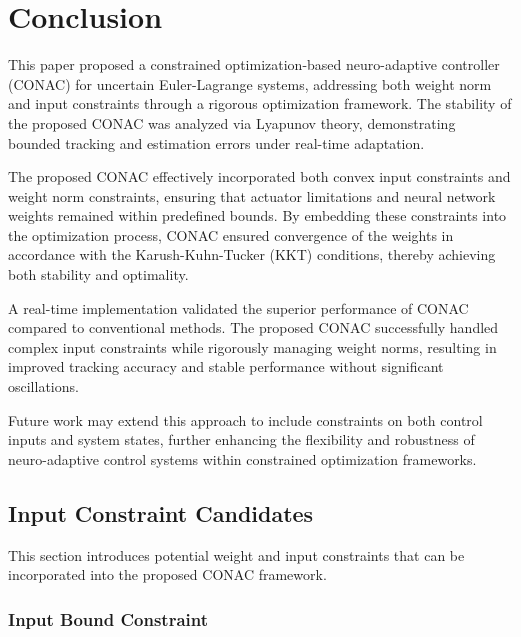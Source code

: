 \documentclass[journal]{IEEEtran}
\begin{document}
\section{Conclusion}\label{sec:conclusion}

This paper proposed a constrained optimization-based neuro-adaptive controller (CONAC) for uncertain Euler-Lagrange systems, addressing both weight norm and input constraints through a rigorous optimization framework. 
The stability of the proposed CONAC was analyzed via Lyapunov theory, demonstrating bounded tracking and estimation errors under real-time adaptation.

The proposed CONAC effectively incorporated both convex input constraints and weight norm constraints, ensuring that actuator limitations and neural network weights remained within predefined bounds. 
By embedding these constraints into the optimization process, CONAC ensured convergence of the weights in accordance with the Karush-Kuhn-Tucker (KKT) conditions, thereby achieving both stability and optimality.

A real-time implementation validated the superior performance of CONAC compared to conventional methods. 
The proposed CONAC successfully handled complex input constraints while rigorously managing weight norms, resulting in improved tracking accuracy and stable performance without significant oscillations.

Future work may extend this approach to include constraints on both control inputs and system states, further enhancing the flexibility and robustness of neuro-adaptive control systems within constrained optimization frameworks.

\appendix

\subsection{Input Constraint Candidates}\label{sec:appen:cstr} 

This section introduces potential weight and input constraints that can be incorporated into the proposed CONAC framework.

\subsubsection{Input Bound Constraint}\label{sec:appen:cstr:input:bound}
\end{document}
